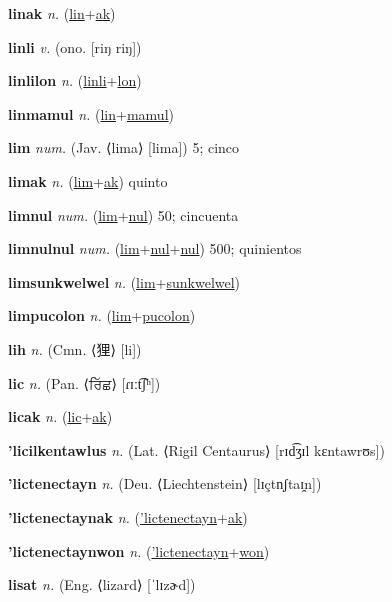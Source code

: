 \textbf{\hypertarget{linak}{linak}} \textit{n.} (\hyperlink{lin}{lin}+\allowbreak \hyperlink{ak}{ak})


\textbf{\hypertarget{linli}{linli}} \textit{v.} (ono. [riŋ riŋ])


\textbf{\hypertarget{linlilon}{linlilon}} \textit{n.} (\hyperlink{linli}{linli}+\allowbreak \hyperlink{lon}{lon})


\textbf{\hypertarget{linmamul}{linmamul}} \textit{n.} (\hyperlink{lin}{lin}+\allowbreak \hyperlink{mamul}{mamul})


\textbf{\hypertarget{lim}{lim}} \textit{num.} (Jav. ⟨lima⟩ [lima])
5; cinco

\textbf{\hypertarget{limak}{limak}} \textit{n.} (\hyperlink{lim}{lim}+\allowbreak \hyperlink{ak}{ak})
quinto

\textbf{\hypertarget{limnul}{limnul}} \textit{num.} (\hyperlink{lim}{lim}+\allowbreak \hyperlink{nul}{nul})
50; cincuenta

\textbf{\hypertarget{limnulnul}{limnulnul}} \textit{num.} (\hyperlink{lim}{lim}+\allowbreak \hyperlink{nul}{nul}+\allowbreak \hyperlink{nul}{nul})
500; quinientos

\textbf{\hypertarget{limsunkwelwel}{limsunkwelwel}} \textit{n.} (\hyperlink{lim}{lim}+\allowbreak \hyperlink{sunkwelwel}{sunkwelwel})


\textbf{\hypertarget{limpucolon}{limpucolon}} \textit{n.} (\hyperlink{lim}{lim}+\allowbreak \hyperlink{pucolon}{pucolon})


\textbf{\hypertarget{lih}{lih}} \textit{n.} (Cmn. ⟨{\chinese{}狸}⟩ [li])


\textbf{\hypertarget{lic}{lic}} \textit{n.} (Pan. ⟨{\gurmukhi{}ਰਿੱਛ}⟩ [ɾɪːt͡ʃʰ])


\textbf{\hypertarget{licak}{licak}} \textit{n.} (\hyperlink{lic}{lic}+\allowbreak \hyperlink{ak}{ak})


\textbf{\hypertarget{'licilkentawlus}{'licilkentawlus}} \textit{n.} (Lat. ⟨Rigil Centaurus⟩ [rɪd͡ʒɪl kɛntawrʊs])


\textbf{\hypertarget{'lictenectayn}{'lictenectayn}} \textit{n.} (Deu. ⟨Liechtenstein⟩ [lɪçtn̩ʃtaɪ̯n])


\textbf{\hypertarget{'lictenectaynak}{'lictenectaynak}} \textit{n.} (\hyperlink{'lictenectayn}{'lictenectayn}+\allowbreak \hyperlink{ak}{ak})


\textbf{\hypertarget{'lictenectaynwon}{'lictenectaynwon}} \textit{n.} (\hyperlink{'lictenectayn}{'lictenectayn}+\allowbreak \hyperlink{won}{won})


\textbf{\hypertarget{lisat}{lisat}} \textit{n.} (Eng. ⟨lizard⟩ [ˈlɪzɚd])



